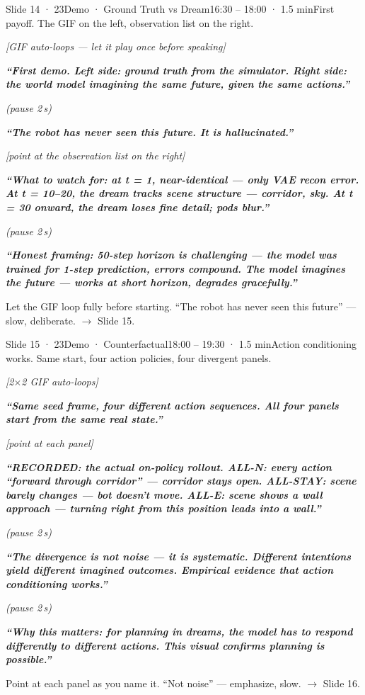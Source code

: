 \documentclass[11pt,a4paper]{article}
\newcommand{\say}[1]{%
    \par\vspace{0.3em}%
    \begingroup
    \leftskip=12pt
    \rightskip=8pt
    \color{thStrong}%
    \itshape\textbf{“#1”}%
    \par
    \endgroup
    \vspace{0.2em}
}
\newcommand{\beat}[1][2]{%
    \par\textcolor{thMuted}{\small\textit{(pause #1\,s)}}\par
    \vspace{0.2em}
}
\newcommand{\stage}[1]{%
    \par\textcolor{thMuted}{\small\textit{[#1]}}\par
    \vspace{0.2em}
}
\newcommand{\emphw}[1]{\textbf{\textcolor{thAmber}{#1}}}
\begin{document}
\begin{slide}{Slide 14 · 23}{Demo · Ground Truth vs Dream}{16:30 – 18:00 · 1.5 min}{First payoff. The GIF on the left, observation list on the right.}
\stage{GIF auto-loops — let it play once before speaking}

\say{First demo. \textbf{Left side: ground truth from the simulator. Right side: the world model imagining the same future, given the same actions.}}
\beat
\say{\emphw{The robot has never seen this future.} It is hallucinated.}

\stage{point at the observation list on the right}

\say{What to watch for: at \textbf{t = 1}, near-identical — only VAE recon error. At \textbf{t = 10–20}, the dream tracks scene structure — corridor, sky. At \textbf{t = 30 onward}, the dream loses fine detail; pods blur.}
\beat
\say{Honest framing: 50-step horizon is challenging — the model was trained for 1-step prediction, errors compound. The model \emphw{imagines the future — works at short horizon, degrades gracefully}.}

\begin{stagebox}
Let the GIF loop fully before starting. ``The robot has never seen this future'' — slow, deliberate. $\rightarrow$ Slide 15.
\end{stagebox}
\end{slide}

\begin{slide}{Slide 15 · 23}{Demo · Counterfactual}{18:00 – 19:30 · 1.5 min}{Action conditioning works. Same start, four action policies, four divergent panels.}
\stage{2$\times$2 GIF auto-loops}

\say{Same seed frame, four different action sequences. All four panels start from the \textbf{same real state}.}

\stage{point at each panel}

\say{\textbf{RECORDED}: the actual on-policy rollout. \textbf{ALL-N}: every action ``forward through corridor'' — corridor stays open. \textbf{ALL-STAY}: scene barely changes — bot doesn't move. \textbf{ALL-E}: scene shows a wall approach — turning right from this position leads into a wall.}
\beat
\say{The divergence is \textbf{not noise} — it is \emphw{systematic}. Different intentions yield different imagined outcomes. \textbf{Empirical evidence that action conditioning works.}}
\beat
\say{Why this matters: for planning in dreams, the model has to respond \emph{differently} to \emph{different} actions. This visual confirms planning is possible.}

\begin{stagebox}
Point at each panel as you name it. ``Not noise'' — emphasize, slow. $\rightarrow$ Slide 16.
\end{stagebox}
\end{slide}
\end{document}
